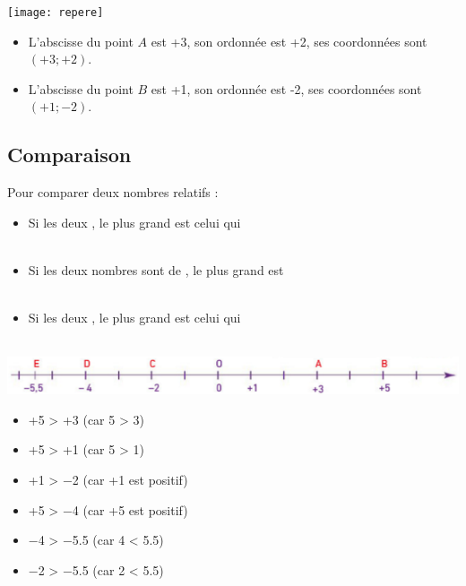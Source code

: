 \begin{myexs}
	
		\begin{center}
			\texttt{[image: repere]}
		\end{center}
	

	\begin{itemize}
		\item L'abscisse du point $A$ est +3, son ordonnée est +2, ses coordonnées sont $(+3; +2)$.
		
		\item L'abscisse du point $B$ est +1, son ordonnée est -2, ses coordonnées sont $(+1; -2)$.
	\end{itemize}

\end{myexs}


\newpage

\subsection{Comparaison}

\begin{myprops}
	Pour comparer deux nombres relatifs :
	\begin{itemize}
		\item Si les deux , le plus grand est celui qui \\ \ %
		\item Si les deux nombres sont de , le plus grand est \\ \ %
		\item Si les deux , le plus grand est celui qui \\ \ %
	\end{itemize}
\end{myprops}


\begin{myexs}
	\begin{center}
		\includegraphics[scale=0.5]{img/droite2}		
	\end{center}
	
	
	\begin{multicols}{2}
		\begin{itemize}
			\item +5 > +3 (car 5 > 3)
			\item +5 > +1 (car 5 > 1)
			\item +1 > \num{-2} (car +1 est positif)
			\item +5 > \num{-4} (car +5 est positif)
			\item \num{-4} > \num{-5.5} (car 4 < \num{5.5})
			\item \num{-2} > \num{-5.5} (car 2 < \num{5.5})
		\end{itemize}
	\end{multicols}
\end{myexs}

